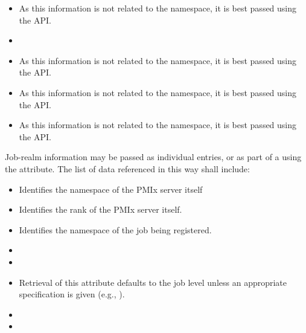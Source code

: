 \begin{itemize}
    \item {}As this information is not related to the namespace, it is best passed using the  \ac{API}.
    \pasteAttributeItemEnd
    \item {}
    \item {}As this information is not related to the namespace, it is best passed using the  \ac{API}.
    \pasteAttributeItemEnd
    \item {}As this information is not related to the namespace, it is best passed using the  \ac{API}.
    \pasteAttributeItemEnd
    \item {}As this information is not related to the namespace, it is best passed using the  \ac{API}.
    \pasteAttributeItemEnd
\end{itemize}

Job-realm information may be passed as individual  entries, or as part of a  using the  attribute. The list of data referenced in this way shall include:

\begin{itemize}
    \item {}Identifies the namespace of the \ac{PMIx} server itself
    \pasteAttributeItemEnd
    \item {}Identifies the rank of the \ac{PMIx} server itself.
    \pasteAttributeItemEnd
    \item {}Identifies the namespace of the job being registered.
    \pasteAttributeItemEnd
    \item {}
    \item {}
    \item {}Retrieval of this attribute defaults to the job level unless an appropriate specification is given (e.g., ).
    \pasteAttributeItemEnd
    \item {}
    \item {}
\end{itemize}

